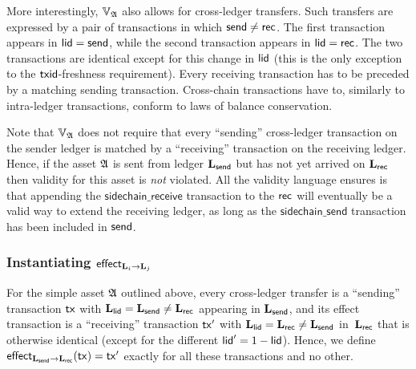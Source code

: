 More interestingly, $\mathbb{V}_{\mathfrak{A}}$ also allows for cross-ledger transfers. Such
transfers are expressed by a pair of transactions in which $\mathsf{send} \neq \mathsf{rec}$.
The first transaction appears in $\mathsf{lid} = \mathsf{send}$, while the second transaction
appears in $\mathsf{lid} = \mathsf{rec}$. The two transactions are identical except for this
change in $\mathsf{lid}$ (this is the only exception to the $\mathsf{txid}$-freshness
requirement). Every receiving transaction has to be preceded by a matching
sending transaction. Cross-chain transactions have to, similarly to intra-ledger
transactions, conform to laws of balance conservation.

Note that $\mathbb{V}_{\mathfrak{A}}$ does not require that every ``sending''
cross-ledger transaction on the sender ledger is matched by a ``receiving''
transaction on the receiving ledger. Hence, if the asset $\mathfrak{A}$ is sent from
ledger $\mathbf{L}_{\mathsf{send}}$ but has not yet arrived on $\mathbf{L}_{\mathsf{rec}}$ then
validity for this asset is \emph{not} violated. All the validity language
ensures is that appending the $\mathsf{sidechain\_receive}$ transaction to the
$\mathsf{rec}$ will eventually be a valid way to extend the receiving ledger, as long as
the $\mathsf{sidechain\_send}$ transaction has been included in $\mathsf{send}$.

\subsubsection{Instantiating $\mathsf{effect}_{\mathbf{L}_i\rightarrow \mathbf{L}_j}$}
For the simple asset $\mathfrak{A}$ outlined above, every cross-ledger transfer is a
``sending'' transaction $\mathsf{tx}$ with
$\mathbf{L}_{\mathsf{lid}}=\mathbf{L}_{\mathsf{send}}\neq\mathbf{L}_{\mathsf{rec}}$ appearing in $\mathbf{L}_{\mathsf{send}}$,
and its effect transaction is a ``receiving'' transaction $\mathsf{tx}'$ with
$\mathbf{L}_{\mathsf{lid}}=\mathbf{L}_{\mathsf{rec}}\neq\mathbf{L}_{\mathsf{send}}$ in~$\mathbf{L}_{\mathsf{rec}}$ that is
otherwise identical (except for the different $\mathsf{lid}' = 1-\mathsf{lid}$).
Hence, we
define $\mathsf{effect}_{\mathbf{L}_{\mathsf{send}}\rightarrow \mathbf{L}_{\mathsf{rec}}}(\mathsf{tx})=\mathsf{tx}'$ exactly for all these transactions
and no other.

